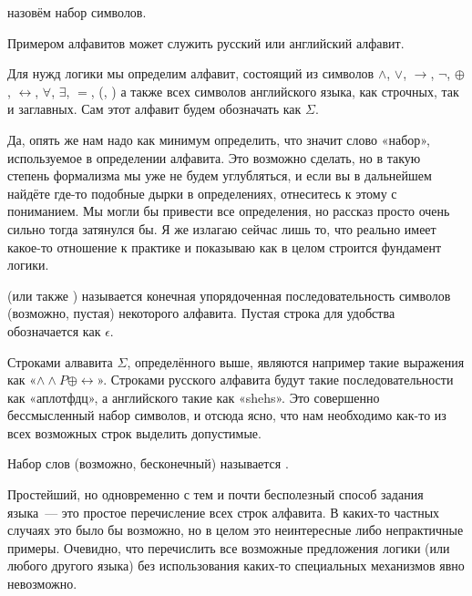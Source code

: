 \begin{definition}
 назовём набор символов.
\end{definition}

\begin{example}
Примером алфавитов может служить русский или английский алфавит.
\end{example}

\begin{example}
Для нужд логики мы определим алфавит, состоящий из символов $\land$, $\lor$, $\to$, $\neg$, $\oplus$, $\leftrightarrow$, $\forall$, $\exists$, $=$, (, ) а также всех символов английского языка, как строчных, так и заглавных. Сам этот алфавит будем обозначать как $\Sigma$.
\end{example}

Да, опять же нам надо как минимум определить, что значит слово «набор», используемое в определении алфавита. Это возможно сделать, но в такую степень формализма мы уже не будем углубляться, и если вы в дальнейшем найдёте где-то подобные дырки в определениях, отнеситесь к этому с пониманием. Мы могли бы привести все определения, но рассказ просто очень сильно тогда затянулся бы. Я же излагаю сейчас лишь то, что реально имеет какое-то отношение к практике и показываю как в целом строится фундамент логики.

\begin{definition}
 (или также ) называется конечная упорядоченная последовательность символов (возможно, пустая) некоторого алфавита. Пустая строка для удобства обозначается как $\epsilon$.
\end{definition}

Строками алвавита $\Sigma$, определённого выше, являются например такие выражения как «$\land\land P\oplus\leftrightarrow$». Строками русского алфавита будут такие последовательности как «аплотфдц», а английского такие как «shehs». Это совершенно бессмысленный набор символов, и отсюда ясно, что нам необходимо как-то из всех возможных строк выделить допустимые.

\begin{definition}
Набор слов (возможно, бесконечный) называется .
\end{definition}

Простейший, но одновременно с тем и почти бесполезный способ задания языка~— это простое перечисление всех строк алфавита. В каких-то частных случаях это было бы возможно, но в целом это неинтересные либо непрактичные примеры. Очевидно, что перечислить все возможные предложения логики (или любого другого языка) без использования каких-то специальных механизмов явно невозможно.

